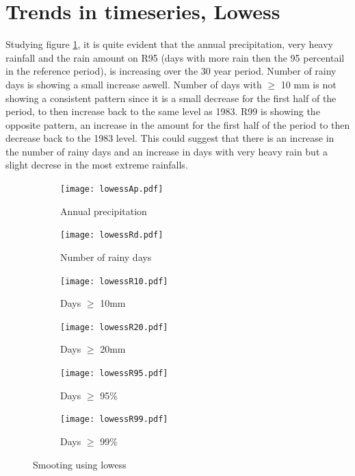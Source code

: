 \documentclass{article}
\begin{document}
\section{Trends in timeseries, Lowess}
Studying figure \ref{lowess}, it is quite evident that the annual precipitation, very heavy rainfall and the rain amount on R95 (days with more rain then the 95 percentail in the reference period), is increasing over the 30 year period. Number of rainy days is showing a small increase aswell. Number of days with $\geq$ 10 mm is not showing a consistent pattern since it is a small decrease for the first half of the period, to then increase back to the same level as 1983. R99 is showing the opposite pattern, an increase in the amount for the first half of the period to then decrease back to the 1983 level. 
This could suggest that there is an increase in the number of rainy days and an increase in days with very heavy rain but a slight decrese in the most extreme rainfalls. 
\begin{figure}[H]
	\centering
	\begin{subfigure}{0.5\textwidth}
		\centering
		\texttt{[image: lowessAp.pdf]}
		\caption{Annual precipitation}
	\end{subfigure}%
	\begin{subfigure}{0.5\textwidth}
		\centering
		\texttt{[image: lowessRd.pdf]}
		\caption{Number of rainy days}
	\end{subfigure}	
	\begin{subfigure}{0.5\textwidth}
		\centering
		\texttt{[image: lowessR10.pdf]}
		\caption{Days $\geq$ 10mm}
	\end{subfigure}%
	\begin{subfigure}{0.5\textwidth}
		\centering
		\texttt{[image: lowessR20.pdf]}
		\caption{Days $\geq$ 20mm}
	\end{subfigure}
	\begin{subfigure}{0.5\textwidth}
		\centering
		\texttt{[image: lowessR95.pdf]}
		\caption{Days $\geq$ 95\%}
	\end{subfigure}%
	\begin{subfigure}{0.5\textwidth}
		\centering
		\texttt{[image: lowessR99.pdf]}
		\caption{Days $\geq$ 99\%}
	\end{subfigure}
	\caption{Smooting using lowess}
	\label{lowess}
\end{figure}
\end{document}
